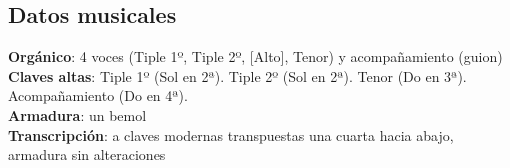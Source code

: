 \subsection*{Datos musicales}
\noindent \textbf{Orgánico}: 4 voces (Tiple 1º, Tiple 2º, [Alto], Tenor) y acompañamiento (guion)\\
\textbf{Claves altas}: Tiple 1º (Sol en 2ª). Tiple 2º (Sol en 2ª). Tenor (Do en 3ª). Acompañamiento (Do en 4ª).\\
\textbf{Armadura}: un bemol\\
\textbf{Transcripción}: a claves modernas transpuestas una cuarta hacia abajo, armadura sin alteraciones

